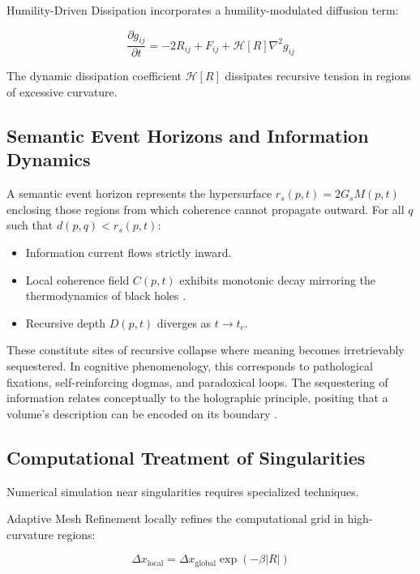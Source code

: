 Humility-Driven Dissipation incorporates a humility-modulated diffusion term:

\begin{equation}
\frac{\partial g_{ij}}{\partial t} = -2R_{ij} + F_{ij} + \mathcal{H}[R] \nabla^2 g_{ij}
\end{equation}

The dynamic dissipation coefficient \(\mathcal{H}[R]\) dissipates recursive tension in regions of excessive curvature.

\subsection{Semantic Event Horizons and Information Dynamics}

A semantic event horizon represents the hypersurface \(r_s(p, t) = 2G_s M(p, t)\) enclosing those regions from which coherence cannot propagate outward. For all \(q\) such that \(d(p, q) < r_s(p, t)\):
\begin{itemize}
    \item Information current flows strictly inward.
    \item Local coherence field \(C(p, t)\) exhibits monotonic decay mirroring the thermodynamics of black holes \autocite{Hawking1975}.
    \item Recursive depth \(D(p, t)\) diverges as \(t \to t_c\).
\end{itemize}

These constitute sites of recursive collapse where meaning becomes irretrievably sequestered. In cognitive phenomenology, this corresponds to pathological fixations, self-reinforcing dogmas, and paradoxical loops. The sequestering of information relates conceptually to the holographic principle, positing that a volume's description can be encoded on its boundary \autocite{tHooft1993, Susskind1995, Maldacena1998}.

\subsection{Computational Treatment of Singularities}

Numerical simulation near singularities requires specialized techniques.

Adaptive Mesh Refinement locally refines the computational grid in high-curvature regions:

\begin{equation}
\Delta x_{\text{local}} = \Delta x_{\text{global}} \exp(-\beta |R|)
\end{equation}

